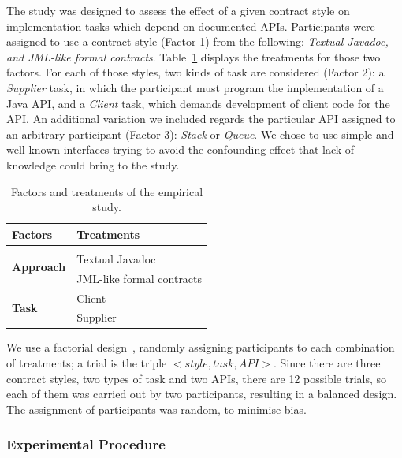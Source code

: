 The study was designed to assess the effect of a given contract style on implementation tasks which depend on documented APIs. 
Participants were assigned to use a contract style (Factor 1) from the following: \emph{Textual Javadoc, \contractjdoc{} and JML-like formal contracts}. Table~\ref{tab:factorsEmpStudy} displays the treatments for those two factors.
For each of those styles, two kinds of task are considered (Factor 2): a \textit{Supplier} task, in which the participant must program the implementation of a Java API, and a \textit{Client} task, which demands development of client code for the API.
An additional variation we included regards the particular API assigned to an arbitrary participant (Factor 3): \textit{Stack} or \textit{Queue}. We chose to use simple and well-known interfaces trying to avoid the confounding effect that lack of knowledge could bring to the study.


\begin{table}[ht]
\caption{Factors and treatments of the empirical study.}
\label{tab:factorsEmpStudy}
\centering
\begin{tabular}{ll} \toprule
\bfseries Factors & \bfseries Treatments \\
\hline

\multirow{3}{*}{\textbf{Approach}} & \contractjdoc{} \\
 & Textual Javadoc \\
& JML-like formal contracts \\ \hline 
\multirow{2}{*}{\textbf{Task}} & Client \\
& Supplier \\ 
\bottomrule
\end{tabular}
\end{table}

We use a factorial design~\cite{wohlin}, randomly assigning participants to each combination of treatments; a trial is the triple $<style, task, API>$.
Since there are three contract styles, two types of task and two APIs, there are 12 possible trials, so each of them was carried out by two participants, resulting in a balanced design. 
The assignment of participants was random, to minimise bias.

\subsubsection{Experimental Procedure}
\label{sec:expProcedure}

